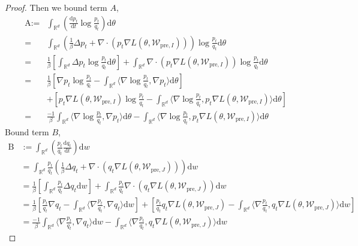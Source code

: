 \begin{proof}
	Then we bound term $A$,
	$$
	\begin{aligned}
		\text{A} :=&\int_{\mathbb{R}^d}\left(\frac{\mathrm{d}p_t}{\mathrm{d}t}\log\frac{p_t}{q_t}\right)\mathrm{d}\theta  \\
		=&\int_{\mathbb{R}^d}\left(\frac1\beta\Delta p_t+\nabla \cdot(p_t \nabla L(\theta, \mathcal{W}_{\text{pre},I}))\right)\log\frac{p_t}{q_t}\mathrm{d}\theta \\
		=&\frac1\beta\left[\int_{\mathbb{R}^d}\Delta p_t\log\frac{p_t}{q_t}\mathrm{d}\theta\right]+\int_{\mathbb{R}^d}\nabla\cdot(p_t\nabla L(\theta, \mathcal{W}_{\text{pre},I}))\log\frac{p_t}{q_t}\mathrm{d}\theta \\
		=&\frac1\beta\left[\nabla p_t\operatorname{log}\frac{p_t}{q_t}-\int_{\mathbb{R}^d}\langle\nabla\log\frac{p_t}{q_t},\nabla p_t\rangle\mathrm{d}\theta\right]\\
		&+\left[p_t \nabla L(\theta, \mathcal{W}_{\text{pre},I})\log\frac{p_t}{q_t}-\int_{\mathbb{R}^d}\langle\nabla\log\frac{p_t}{q_t},p_t\nabla L(\theta, \mathcal{W}_{\text{pre},I})\rangle\mathrm{d}\theta\right]\\
		=&\frac{-1}\beta\int_{\mathbb{R}^d}\langle\nabla\log\frac{p_t}{q_t},\nabla p_t\rangle\mathrm{d}\theta-\int_{\mathbb{R}^d}\langle\nabla\log\frac{p_t}{q_t},p_t\nabla L(\theta, \mathcal{W}_{\text{pre},I})\rangle\mathrm{d}\theta
	\end{aligned}
	$$
	Bound term $B$, 
	$$
	\begin{aligned}
		\text{B}& :=\int_{\mathbb{R}^d}\left(\frac{p_t}{q_t}\frac{\mathrm{d}q_t}{\mathrm{d}t}\right)\mathrm{d}w  \\
		&=\int_{\mathbb{R}^d}\frac{p_t}{q_t}\left(\frac1\beta\Delta q_t+\nabla\cdot(q_t\nabla L(\theta, \mathcal{W}_{\text{pre},J}))\right)\mathrm{d}w \\
		&=\frac1\beta\left[\int_{\mathbb{R}^d}\frac{p_t}{q_t}\Delta q_t\mathrm{d}w\right]+\int_{\mathbb{R}^d}\frac{p_t}{q_t}\nabla\cdot(q_t\nabla L(\theta, \mathcal{W}_{\text{pre},J}))\mathrm{d}w \\ 
		&=\frac1\beta\left[\frac{p_t}{q_t}\nabla q_t-\int_{\mathbb{R}^d}\langle\nabla\frac{p_t}{q_t},\nabla q_t\rangle\mathrm{d}w\right]+\left[\frac{p_t}{q_t}q_t\nabla L(\theta, \mathcal{W}_{\text{pre},J})-\int_{\mathbb{R}^d}\langle\nabla\frac{p_t}{q_t},q_t\nabla L(\theta, \mathcal{W}_{\text{pre},J})\rangle\mathrm{d}w\right]\\
		&=\frac{-1}\beta\int_{\mathbb{R}^d}\langle\nabla\frac{p_t}{q_t},\nabla q_t\rangle\mathrm{d}w-\int_{\mathbb{R}^d}\langle\nabla\frac{p_t}{q_t},q_t\nabla L(\theta, \mathcal{W}_{\text{pre},J})\rangle\mathrm{d}w

\end{aligned}$$
\end{proof}

